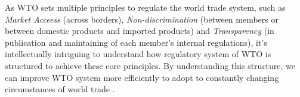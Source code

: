 As WTO sets multiple principles to regulate the world trade system, 
such as \textit{Market Acceess} (across borders), 
\textit{Non-discrimination} (between members 
or between domestic products and imported products) 
and \textit{Transparency} (in publication and maintaining 
of each member's internal regulations), 
it's intellectually intriguing 
to understand how regulatory system of WTO
is structured to achieve these core principles.
By understanding this structure, 
we can improve WTO system more efficiently to adopt to constantly 
changing circumstances of world trade
\citep{FREDEBEULKREIN1999625, shaffer_2004, 10.1093/jiel/jgm028}.



